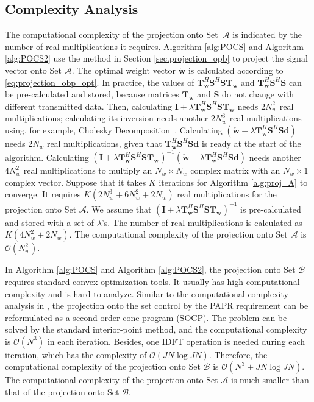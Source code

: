 \documentclass[paper]{ieice}
\begin{document}
\subsection{Complexity Analysis} \label{sec:POCS_complexity analysis}

The computational complexity of the projection onto Set~$\mathcal{A}$ is indicated by the number of real multiplications it requires. Algorithm \ref{alg:POCS} and Algorithm \ref{alg:POCS2} use the method in Section \ref{sec.projection_opb} to project the signal vector onto Set $\mathcal{A}$.  The optimal weight vector $\check{\mathbf{w}}$ is calculated according to \eqref{eq:projection_obp_opt}.  In practice, the values of $\mathbf{T}_{\mathbf{w}}^H\mathbf{S}^H\mathbf{S}\mathbf{T}_{\mathbf{w}}$ and $\mathbf{T}_{\mathbf{w}}^H\mathbf{S}^H\mathbf{S}$ can be pre-calculated and stored, because matrices $\mathbf{T}_{\mathbf{w}}$ and $\mathbf{S}$ do not change with different transmitted data. Then, calculating $\mathbf{I}+\lambda\mathbf{T}_{\mathbf{w}}^H\mathbf{S}^H\mathbf{S}\mathbf{T}_{\mathbf{w}}$ needs $2N_w^2$ real multiplications; calculating its inversion needs another $2N_w^3$ real multiplications using, for example, Cholesky Decomposition~\cite{krishnamoorthy2013matrix}.  Calculating $(\check{\mathbf{w}} -\lambda \mathbf{T}_{\mathbf{w}}^H\mathbf{S}^H\mathbf{S}\mathbf{d})$ needs $2N_w$ real multiplications, given that $\mathbf{T}_{\mathbf{w}}^H\mathbf{S}^H\mathbf{S}\mathbf{d}$ is ready at the start of the algorithm.  Calculating $(\mathbf{I}+\lambda\mathbf{T}_{\mathbf{w}}^H\mathbf{S}^H\mathbf{S}\mathbf{T}_{\mathbf{w}})^{-1}(\check{\mathbf{w}} -\lambda \mathbf{T}_{\mathbf{w}}^H\mathbf{S}^H\mathbf{S}\mathbf{d})$ needs another $4N_w^2$ real multiplications to multiply an $N_w \times N_w$ complex matrix with an $N_w \times 1$ complex vector.  Suppose that it takes $K$ iterations for Algorithm \ref{alg:proj_A} to converge.  It requires $K (2N_w^3 + 6N_w^2 + 2N_w)$ real multiplications for the projection onto Set $\mathcal{A}$. We assume that $(\mathbf{I}+\lambda\mathbf{T}_{\mathbf{w}}^H\mathbf{S}^H\mathbf{S}\mathbf{T}_{\mathbf{w}})^{-1}$ is pre-calculated and stored with a set of $\lambda$'s.  The number of real multiplications is calculated as $K(4N_w^2 + 2N_w)$. The computational complexity of the projection onto Set $\mathcal{A}$ is $\mathcal{O}(N_w^2)$.

In Algorithm \ref{alg:POCS} and Algorithm \ref{alg:POCS2}, the projection onto Set $\mathcal{B}$ requires standard convex optimization tools.  It usually has high computational complexity and is hard to analyze. Similar to the computational complexity analysis in \cite{wang2011optimized,ni2015joint}, the projection onto the set control by the PAPR requirement can be reformulated as a second-order cone program (SOCP). The problem can be solved by the standard
interior-point method, and the computational complexity is $\mathcal{O}(N^3)$ in each
iteration. Besides, one IDFT operation is needed during each iteration, which has the complexity of $\mathcal{O}(JN \log JN)$.
Therefore, the computational complexity of the projection onto Set $\mathcal{B}$ is $\mathcal{O}(N^3 + JN \log JN)$. The computational complexity of the projection onto Set $\mathcal{A}$ is much smaller than that of the projection onto Set $\mathcal{B}$. 
\end{document}
